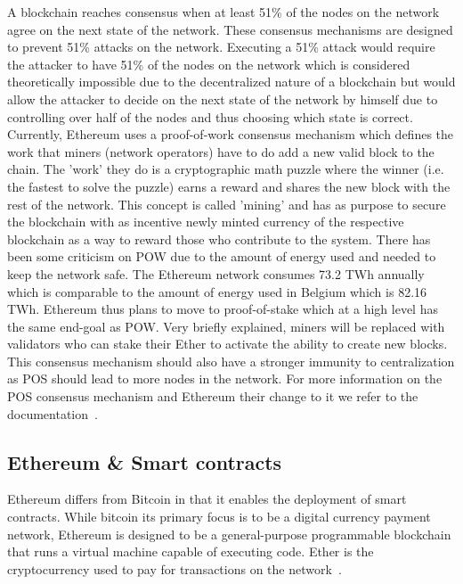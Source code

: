 \documentclass[10pt,conference]{IEEEtran}
\begin{document}
A blockchain reaches consensus when at least 51\% of the nodes on the network agree on the next state of the network. These consensus mechanisms are designed to prevent 51\% attacks on the network. Executing a 51\% attack would require the attacker to have 51\% of the nodes on the network which is considered theoretically impossible due to the decentralized nature of a blockchain but would allow the attacker to decide on the next state of the network by himself due to controlling over half of the nodes and thus choosing which state is correct. Currently, Ethereum uses a proof-of-work consensus mechanism which defines the work that miners (network operators) have to do add a new valid block to the chain. The 'work' they do is a cryptographic math puzzle where the winner (i.e. the fastest to solve the puzzle) earns a reward and shares the new block with the rest of the network. This concept is called 'mining' and has as purpose to secure the blockchain with as incentive newly minted currency of the respective blockchain as a way to reward those who contribute to the system. There has been some criticism on POW due to the amount of energy used and needed to keep the network safe. The Ethereum network consumes 73.2 TWh annually which is comparable to the amount of energy used in Belgium which is 82.16 TWh. Ethereum thus plans to move to proof-of-stake which at a high level has the same end-goal as POW. Very briefly explained, miners will be replaced with validators who can stake their Ether to activate the ability to create new blocks. This consensus mechanism should also have a stronger immunity to centralization as POS should lead to more nodes in the network. For more information on the POS consensus mechanism and Ethereum their change to it we refer to the documentation~\cite{ethereum,  white_paper}.

\subsection{Ethereum \& Smart contracts}

Ethereum differs from Bitcoin in that it enables the deployment of smart contracts. %
While bitcoin its primary focus is to be a digital currency payment network, Ethereum is designed to be a general-purpose programmable blockchain that runs a virtual machine capable of executing code.
Ether is the cryptocurrency used to pay for transactions on the network~\cite{mastering}.%
\end{document}
